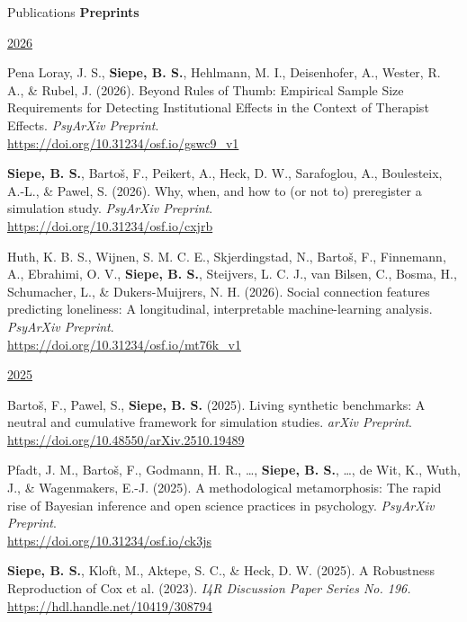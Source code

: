 \documentclass{resume} %
\begin{document}
\begin{rSection}{Publications}
\textbf{\large Preprints}


\underline{2026}
\begin{etaremune}
    \item Pena Loray, J. S., \textbf{Siepe, B. S.}, Hehlmann, M. I., Deisenhofer, A., Wester, R. A., \& Rubel, J. (2026). Beyond Rules of Thumb: Empirical Sample Size Requirements for Detecting Institutional Effects in the Context of Therapist Effects. \textit{PsyArXiv Preprint}. \\
    \url{https://doi.org/10.31234/osf.io/gswc9_v1}
    \item \textbf{Siepe, B. S.}, Bartoš, F., Peikert, A., Heck, D. W., Sarafoglou, A., Boulesteix, A.-L., \& Pawel, S. (2026). Why, when, and how to (or not to) preregister a simulation study. \textit{PsyArXiv Preprint}. \\
    \url{https://doi.org/10.31234/osf.io/cxjrb}
    \item Huth, K. B. S., Wijnen, S. M. C. E., Skjerdingstad, N., Bartoš, F., Finnemann, A., Ebrahimi, O. V., \textbf{Siepe, B. S.}, Steijvers, L. C. J., van Bilsen, C., Bosma, H., Schumacher, L., \& Dukers-Muijrers, N. H. (2026). Social connection features predicting loneliness: A longitudinal, interpretable machine-learning analysis. \textit{PsyArXiv Preprint}. \\
\url{https://doi.org/10.31234/osf.io/mt76k_v1}

\hspace{-0.75cm}\underline{2025}

    \item  Bartoš, F., Pawel, S., \textbf{Siepe, B. S.} (2025). Living synthetic benchmarks: A neutral and cumulative framework for simulation studies. \textit{arXiv Preprint}. \\
\url{https://doi.org/10.48550/arXiv.2510.19489}
    \item  Pfadt, J. M., Bartoš, F., Godmann, H. R., \ldots, \textbf{Siepe, B. S.}, \ldots, de Wit, K., Wuth, J., \& Wagenmakers, E.-J. (2025). A methodological metamorphosis: The rapid rise of Bayesian inference and open science practices in psychology. \textit{PsyArXiv Preprint}. \\
\url{https://doi.org/10.31234/osf.io/ck3js}
    \item \textbf{Siepe, B. S.}, Kloft, M., Aktepe, S. C., \& Heck, D. W. (2025). A Robustness Reproduction of Cox et al. (2023). \textit{I4R Discussion Paper Series No. 196.}\\
\url{https://hdl.handle.net/10419/308794}
\end{etaremune}


\end{rSection}
\end{document}
